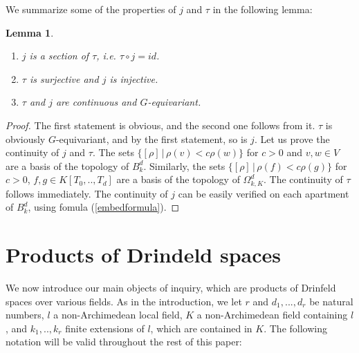 \documentclass{amsart}
\theoremstyle{theorem}
\theoremstyle{lemma}
\newtheorem{lemma}{Lemma}[section]
\theoremstyle{prop}
\theoremstyle{definition}
\theoremstyle{corollary}
\theoremstyle{remark}
\begin{document}
We summarize some of the properties of $j$ and $\tau$ in the following lemma:
\begin{lemma} \begin{enumerate}
\item
$j$ is a section of $\tau$, i.e. $\tau \circ j = id$.
\item
$\tau$ is surjective and $j$ is injective. 
\item
$\tau$ and $j$ are continuous and $G$-equivariant. 

\end{enumerate} \end{lemma}

\begin{proof}
The first statement is obvious, and the second one follows from it. $\tau$ is obviously $G$-equivariant, and by the first statement, so is $j$. 
Let us prove the continuity of $j$ and $\tau$. The sets $\{[\rho]\,|\,\rho(v) < c \rho(w)\}$ for $c>0$ and $v,w \in V$ are a basis of the topology of $B^d_k$. Similarly, the sets $\{[\rho] \, | \, \rho(f) < c \rho(g)\}$ for $c>0$, $f,g \in K[T_0,..,T_d]$ are a basis of the topology of $\Omega^d_{k,K}$. The continuity of $\tau$ follows immediately. The continuity of $j$ can be easily verified on each apartment of $B^d_{k}$, using fomula (\ref{embedformula}).
\end{proof} 


\section{Products of Drindeld spaces}
We now introduce our main objects of inquiry, which are products of Drinfeld spaces over various fields.
As in the introduction, we let $r$ and $d_1,...,d_r$ be natural numbers,  $l$ a non-Archimedean local field, $K$ a non-Archimedean field containing $l$, and $k_1,..,k_r$ finite extensions of $l$, which are contained in $K$.
The following notation will be valid throughout the rest of this paper:
\end{document}
